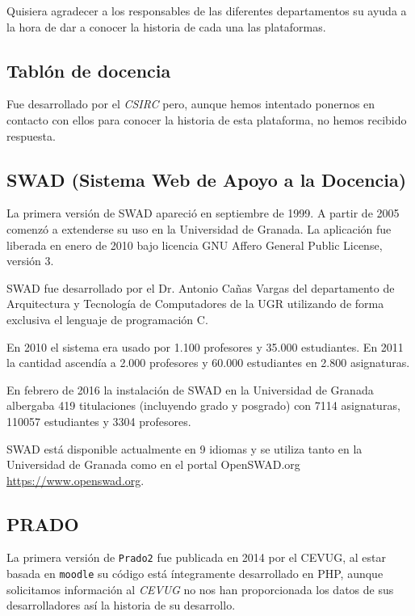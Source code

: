 \bigskip
Quisiera agradecer a los responsables de las diferentes departamentos su ayuda a la hora de dar a conocer la historia de cada una las plataformas.

\subsection{Tablón de docencia}

Fue desarrollado por el \textit{CSIRC} pero, aunque hemos intentado ponernos en contacto con ellos para conocer la historia de esta plataforma, no hemos recibido respuesta.

\subsection{SWAD (Sistema Web de Apoyo a la Docencia)}

La primera versión de SWAD apareció en septiembre de 1999. A partir de 2005 comenzó a extenderse su uso en la Universidad de Granada. La aplicación fue liberada en enero de 2010 bajo licencia GNU Affero General Public License, versión 3.

\bigskip
SWAD fue desarrollado por el Dr. Antonio Cañas Vargas del departamento de Arquitectura y Tecnología de Computadores de la UGR utilizando de forma exclusiva el lenguaje de programación C.

\bigskip
En 2010 el sistema era usado por 1.100 profesores y 35.000 estudiantes. En 2011 la cantidad ascendía a 2.000 profesores y 60.000 estudiantes en 2.800 asignaturas.

\bigskip
En febrero de 2016 la instalación de SWAD en la Universidad de Granada albergaba 419 titulaciones (incluyendo grado y posgrado) con 7114 asignaturas, 110057 estudiantes y 3304 profesores.

\bigskip
SWAD está disponible actualmente en 9 idiomas y se utiliza tanto en la Universidad de Granada como en el portal OpenSWAD.org \url{https://www.openswad.org}.


\subsection{PRADO}

La primera versión de \texttt{Prado2} fue publicada en 2014 por el CEVUG, al estar basada en \texttt{moodle} su código está íntegramente desarrollado en PHP, aunque solicitamos información al \textit{CEVUG} no nos han proporcionada los datos de sus desarrolladores así la historia de su desarrollo.

